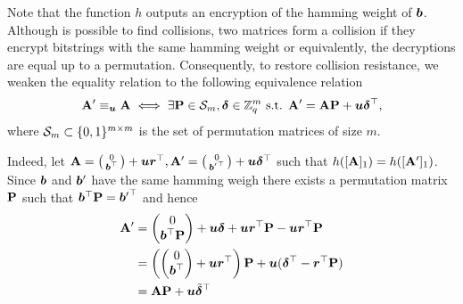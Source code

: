 Note that the function $h$ outputs an encryption of the hamming weight of ${\boldsymbol{b}}$. Although is possible to find collisions, two matrices form a collision if they encrypt bitstrings with the same hamming weight or equivalently, the decryptions are equal up to a permutation. Consequently, to restore collision resistance, we weaken the equality relation to the following equivalence relation
$$
\mathbf{{A}}' \equiv_{\boldsymbol{u}} \mathbf{{A}} \iff \exists \mathbf{{P}}\in\mathcal{S}_m, {\boldsymbol{\delta}}\in\mathbb{Z}_q^m \text{ s.t. } \mathbf{{A}}' = \mathbf{{A}}\mathbf{{P}} + {\boldsymbol{u}}{\boldsymbol{\delta}}^\top,
$$
where $\mathcal{S}_m\subset \{0,1\}^{m\times m}$ is the set of permutation matrices of size $m$.

Indeed, let $\mathbf{{A}}=\left(\begin{smallmatrix}0\\{\boldsymbol{b}}^\top\end{smallmatrix}\right)+{\boldsymbol{u}}{\boldsymbol{r}}^\top,\mathbf{{A}}'=\left(\begin{smallmatrix}0\\{{\boldsymbol{b}}'}^\top\end{smallmatrix}\right)+{\boldsymbol{u}}{\boldsymbol{\delta}}^\top$ such that $h([\mathbf{{A}}]_1)=h([\mathbf{{A}}']_1)$. Since ${\boldsymbol{b}}$ and ${\boldsymbol{b}}'$ have the same hamming weigh there exists a permutation matrix $\mathbf{{P}}$ such that ${\boldsymbol{b}}^\top\mathbf{{P}} = {{\boldsymbol{b}}'}^\top$ and hence
\begin{align*}
\mathbf{{A}}' &= \left(\begin{matrix}0\\{\boldsymbol{b}}^\top\mathbf{{P}}\end{matrix}\right) + {\boldsymbol{u}}{\boldsymbol{\delta}} + {\boldsymbol{u}}{\boldsymbol{r}}^\top\mathbf{{P}} - {\boldsymbol{u}}{\boldsymbol{r}}^\top\mathbf{{P}}\\
&=
 \left(\left(\begin{matrix}0\\{\boldsymbol{b}}^\top\end{matrix}\right) + {\boldsymbol{u}}{\boldsymbol{r}}^\top \right)\mathbf{{P}} + {\boldsymbol{u}}({\boldsymbol{\delta}}^\top-{\boldsymbol{r}}^\top\mathbf{{P}})\\
 &=
 \mathbf{{A}}\mathbf{{P}} + {\boldsymbol{u}}\tilde{{\boldsymbol{\delta}}}^\top
\end{align*}

